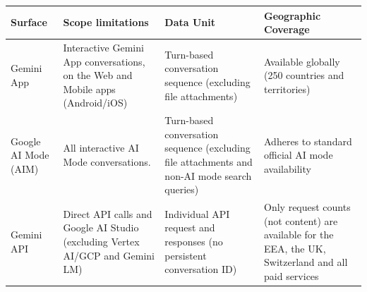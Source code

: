 {\renewcommand{\arraystretch}{1.5} %
\begin{tabular}{
    >{\raggedright\arraybackslash}p{2cm}
    >{\raggedright\arraybackslash}p{3.8cm}
    >{\raggedright\arraybackslash}p{3.8cm}
    >{\raggedright\arraybackslash}p{3.8cm}
}
        \toprule
        \textbf{Surface} & \textbf{Scope limitations} & \textbf{Data Unit} & \textbf{Geographic Coverage} \\
        \midrule
        Gemini App & Interactive Gemini App conversations, on the Web and Mobile apps (Android/iOS) & Turn-based conversation sequence (excluding file attachments) & Available globally (250 countries and territories) \\
        Google AI Mode (AIM) & All interactive AI Mode conversations. & Turn-based conversation sequence (excluding file attachments and non-AI mode search queries) & Adheres to standard official AI mode availability \\
        Gemini API & Direct API calls and Google AI Studio (excluding Vertex AI/GCP and Gemini LM) & Individual API request and responses (no persistent conversation ID) & Only request counts (not content) are available for the EEA, the UK, Switzerland and all paid services \\
        \bottomrule
    \end{tabular}}